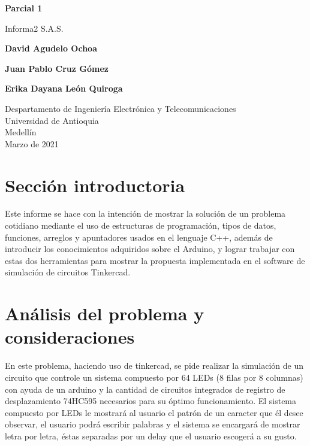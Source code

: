 \documentclass{article}
\begin{document}
\begin{titlepage}
    \begin{center}
        \vspace*{0cm}
            
        \Huge
        \textbf{Parcial 1}
            
        \vspace{0.5cm}
        \LARGE
        Informa2 S.A.S.
            
        \vspace{5cm}
            
        \textbf{David Agudelo Ochoa}
        
        \vspace{0.5cm}
        
        \textbf{Juan Pablo Cruz Gómez}
        
        \vspace{0.5cm}
        
        \textbf{Erika Dayana León Quiroga}
            
        \vfill
            
        \vspace{0.8cm}
            
        \Large
        Despartamento de Ingeniería Electrónica y Telecomunicaciones\\
        Universidad de Antioquia\\
        Medellín\\
        Marzo de 2021
            
    \end{center}
\end{titlepage}

\tableofcontents
\newpage
\section{Sección introductoria}\label{intro}
Este informe se hace con la intención de mostrar la solución de un problema cotidiano mediante el uso de  estructuras de programación, tipos de datos, funciones, arreglos y apuntadores usados en el lenguaje C++, además de introducir los conocimientos adquiridos sobre el Arduino, y lograr trabajar con estas dos herramientas para mostrar la propuesta implementada en el software de simulación de circuitos Tinkercad.

\section{Análisis del problema y consideraciones} \label{contenido}
En este problema, haciendo uso de tinkercad, se pide realizar la simulación de un circuito que controle un sistema compuesto por 64 LEDs (8 filas por 8 columnas) con ayuda de un arduino y la cantidad de circuitos integrados de registro de desplazamiento 74HC595 necesarios para su óptimo funcionamiento. El sistema compuesto por LEDs le mostrará al usuario el patrón de un caracter que él desee observar, el usuario podrá escribir palabras y el sistema se encargará de mostrar letra por letra, éstas separadas por un delay que el usuario escogerá a su gusto.
\end{document}

